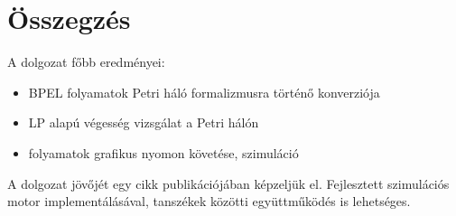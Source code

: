 \chapter{Összegzés}


 A dolgozat főbb eredményei:
\begin{itemize}
\item BPEL folyamatok Petri háló formalizmusra történő konverziója
\item LP alapú végesség vizsgálat a Petri hálón
\item folyamatok grafikus nyomon követése, szimuláció 
\end{itemize}
A dolgozat jövőjét egy cikk publikációjában képzeljük el. Fejlesztett szimulációs motor implementálásával, tanszékek közötti együttműködés is lehetséges. 
